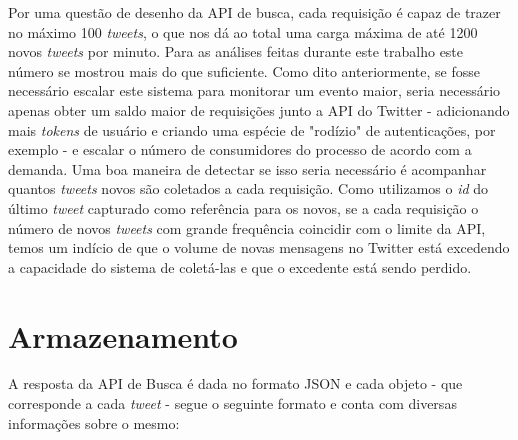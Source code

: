 Por uma questão de desenho da API de busca, cada requisição é capaz de trazer no máximo 100 \textit{tweets}, o que nos dá ao total uma carga máxima de até 1200 novos \textit{tweets} por minuto. Para as análises feitas durante este trabalho este número se mostrou mais do que suficiente. Como dito anteriormente, se fosse necessário escalar este sistema para monitorar um evento maior, seria necessário apenas obter um saldo maior de requisições junto a API do Twitter - adicionando mais \textit{tokens} de usuário e criando uma espécie de "rodízio" de autenticações, por exemplo - e escalar o número de consumidores do processo de acordo com a demanda. Uma boa maneira de detectar se isso seria necessário é acompanhar quantos \textit{tweets} novos são coletados a cada requisição. Como utilizamos o \textit{id} do último \textit{tweet} capturado como referência para os novos, se a cada requisição o número de novos \textit{tweets} com grande frequência coincidir com o limite da API, temos um indício de que o volume de novas mensagens no Twitter está excedendo a capacidade do sistema de coletá-las e que o excedente está sendo perdido.

\section{Armazenamento}
A resposta da API de Busca é dada no formato JSON e cada objeto - que corresponde a cada \textit{tweet} - segue o seguinte formato e conta com diversas informações sobre o mesmo: 

